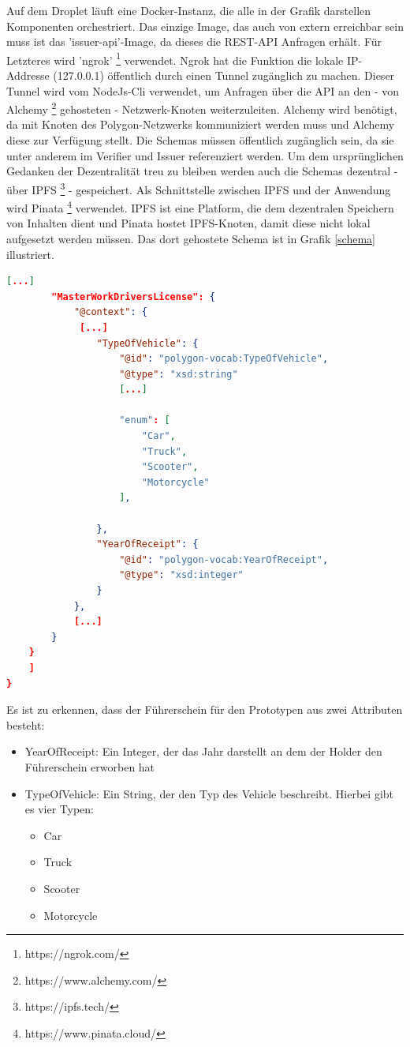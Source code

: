 Auf dem Droplet läuft eine Docker-Instanz, die alle in der Grafik darstellen Komponenten orchestriert. Das einzige Image, das auch von extern erreichbar sein muss ist das 'issuer-api'-Image, da dieses die REST-API Anfragen erhält. Für Letzteres wird 'ngrok' \footnote{https://ngrok.com/} verwendet. Ngrok hat die Funktion die lokale IP-Addresse (127.0.0.1) öffentlich durch einen Tunnel zugänglich zu machen. Dieser Tunnel wird vom NodeJs-Cli verwendet, um Anfragen über die API an den - von Alchemy \footnote{https://www.alchemy.com/} gehosteten - Netzwerk-Knoten weiterzuleiten. Alchemy wird benötigt, da mit Knoten des Polygon-Netzwerks kommuniziert werden muss und Alchemy diese zur Verfügung stellt. Die Schemas müssen öffentlich zugänglich sein, da sie unter anderem im Verifier und Issuer referenziert werden. Um dem ursprünglichen Gedanken der Dezentralität treu zu bleiben werden auch die Schemas dezentral - über IPFS \footnote{https://ipfs.tech/} - gespeichert. Als Schnittstelle zwischen IPFS und der Anwendung wird Pinata \footnote{https://www.pinata.cloud/} verwendet. IPFS ist eine Platform, die dem dezentralen Speichern von Inhalten dient und Pinata hostet IPFS-Knoten, damit diese nicht lokal aufgesetzt werden müssen. Das dort gehostete Schema ist in Grafik \ref{schema} illustriert.
\begin{lstlisting}[language=json,firstnumber=1, caption=Schema des Credentials, label=schema]	
		[...]
		"MasterWorkDriversLicense": {
			"@context": {
			 [...]
				"TypeOfVehicle": {
					"@id": "polygon-vocab:TypeOfVehicle",
					"@type": "xsd:string"
					[...]
					
					"enum": [
						"Car",
						"Truck",
						"Scooter",
						"Motorcycle"
					],
					
				},
				"YearOfReceipt": {
					"@id": "polygon-vocab:YearOfReceipt",
					"@type": "xsd:integer"
				}
			},
			[...]
		}
	}
	]
}
\end{lstlisting}
Es ist zu erkennen, dass der Führerschein für den Prototypen aus zwei Attributen besteht:
\begin{itemize}
	\item YearOfReceipt: Ein Integer, der das Jahr darstellt an dem der Holder den Führerschein erworben hat
	\item TypeOfVehicle: Ein String, der den Typ des Vehicle beschreibt. Hierbei gibt es vier Typen: 
	
	\begin{itemize}
		\item Car
		\item Truck
		\item Scooter
		\item Motorcycle
	\end{itemize}
\end{itemize}

